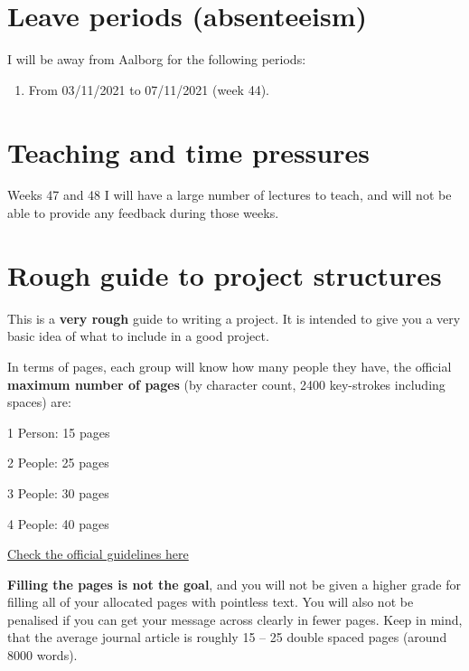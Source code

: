 \documentclass[
]{book}
\providecommand{\tightlist}{%
  \setlength{\itemsep}{0pt}\setlength{\parskip}{0pt}}
\begin{document}
\hypertarget{leave-periods-absenteeism}{%
\section{Leave periods (absenteeism)}\label{leave-periods-absenteeism}}

I will be away from Aalborg for the following periods:

\begin{enumerate}
\def\labelenumi{\arabic{enumi}.}
\tightlist
\item
  From 03/11/2021 to 07/11/2021 (week 44).
\end{enumerate}

\hypertarget{teaching-and-time-pressures}{%
\section{Teaching and time pressures}\label{teaching-and-time-pressures}}

Weeks 47 and 48 I will have a large number of lectures to teach, and will not be able to provide any feedback during those weeks.

\hypertarget{rough-guide-to-project-structures}{%
\section{Rough guide to project structures}\label{rough-guide-to-project-structures}}

This is a \textbf{very rough} guide to writing a project. It is intended to
give you a very basic idea of what to include in a good project.

In terms of pages, each group will know how many people they have, the
official \textbf{maximum number of pages} (by character count, 2400
key-strokes including spaces) are:

1 Person: 15 pages

2 People: 25 pages

3 People: 30 pages

4 People: 40 pages

\href{https://www.business.aau.dk/education/students}{Check the official guidelines here}

\textbf{Filling the pages is not the goal}, and you will not be given a
higher grade for filling all of your allocated pages with pointless
text. You will also not be penalised if you can get your message across
clearly in fewer pages. Keep in mind, that the average journal article
is roughly 15 -- 25 double spaced pages (around 8000 words).
\end{document}
